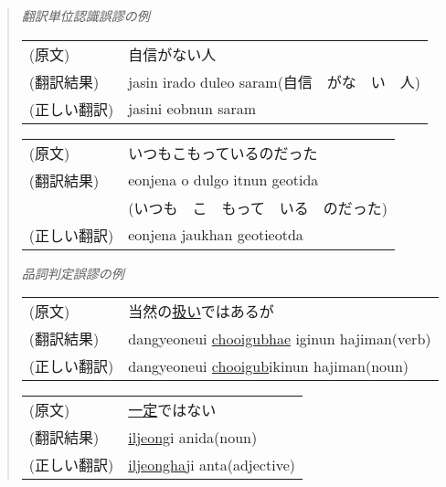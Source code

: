 \begin{quote}
\begin{flushleft}
{\it 翻訳単位認識誤謬の例}
\end{flushleft}

\vspace{0.3cm}
\begin{tabular}{ll}
 (原文)    &   自信がない人 \\
 (翻訳結果) &  jasin  irado duleo saram(自信　がな　い　人) \\
 (正しい翻訳) & jasini  eobnun saram \\
\end{tabular}

\vspace{0.3cm}
\begin{tabular}{ll}
 (原文)  &     いつもこもっているのだった \\
 (翻訳結果) &  eonjena o dulgo itnun geotida\\
 & (いつも　こ　もって　いる　のだった) \\
 (正しい翻訳) & eonjena jaukhan geotieotda \\
\end{tabular}

\vspace{0.5cm}

\begin{flushleft}
{\it 品詞判定誤謬の例}
\end{flushleft}
\vspace{0.5cm}

\begin{tabular}{ll}
 (原文)      & 当然の\underline{扱い}ではあるが \\
 (翻訳結果)  & dangyeoneui \underline{chooigubhae} iginun hajiman(verb) \\
 (正しい翻訳)& dangyeoneui \underline{chooigub}ikinun hajiman(noun) \\
\end{tabular}

\vspace{0.5cm}
\begin{tabular}{ll}
 (原文)      & \underline{一定}ではない \\
 (翻訳結果)  & \underline{iljeong}i anida(noun) \\
 (正しい翻訳)& \underline{iljeongha}ji anta(adjective) \\
\end{tabular}
\end{quote}

\vspace{0.5cm}

